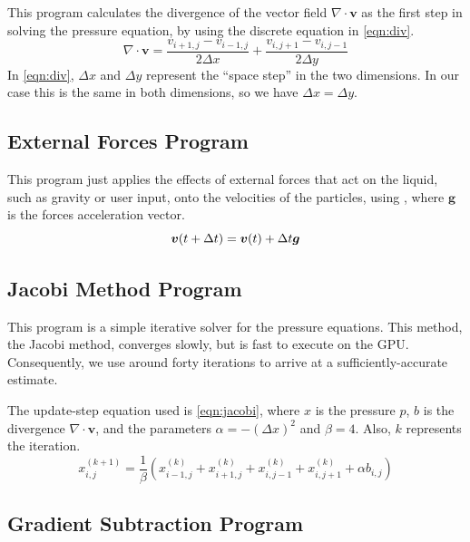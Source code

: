 This program calculates the divergence of the vector field $\nabla \cdot \bm{v}$
as the first step in solving the pressure equation,
by using the discrete equation in \autoref{eqn:div}.
\begin{equation}\label{eqn:div}
  \nabla \cdot \bm{v} = \frac{v_{i+1,j}-v_{i-1,j}}{2\Delta x}+\frac{v_{i,j+1}-v_{i,j-1}}{2\Delta y}
\end{equation}
In \autoref{eqn:div}, $\Delta x$ and $\Delta y$ represent the ``space step'' in the two dimensions.
In our case this is the same in both dimensions, so we have $\Delta x = \Delta y$.

\subsection{External Forces Program}

This program just applies the effects of external forces that act on the liquid,
such as gravity or user input, onto the velocities of the particles,
using \label{eqn:f}, where $\bm{g}$ is the forces acceleration vector.
\begin{equation}\label{eqn:f}
  \bm{v}(t+\Delta t) = \bm{v}(t) + \Delta t \bm{g}
\end{equation}

\subsection{Jacobi Method Program}

This program is a simple iterative solver for the pressure equations.
This method, the Jacobi method, converges slowly, but is fast to execute on the GPU.
Consequently, we use around forty iterations to arrive at a sufficiently-accurate estimate.

The update-step equation used is \autoref{eqn:jacobi}, 
where $x$ is the pressure $p$, $b$ is the divergence $\nabla\cdot\bm{v}$,
and the parameters $\alpha=-(\Delta x)^2$ and $\beta=4$.
Also, $k$ represents the iteration.
\begin{equation}\label{eqn:jacobi}
  x_{i,j}^{(k+1)} = \frac{1}{\beta} \left( x_{i-1,j}^{(k)} + x_{i+1,j}^{(k)} + x_{i,j-1}^{(k)} + x_{i,j+1}^{(k)} + \alpha b_{i,j} \right)
\end{equation}

\subsection{Gradient Subtraction Program}

